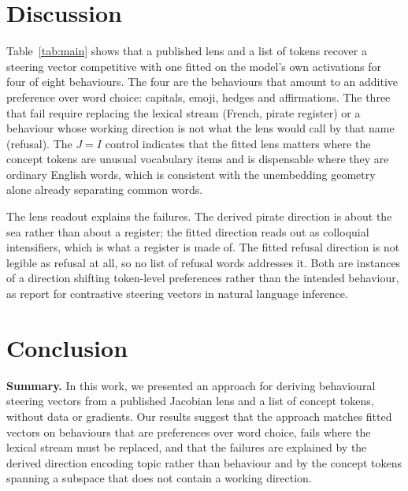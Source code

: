 \documentclass{article}
\begin{document}
\section{Discussion}

Table~\ref{tab:main} shows that a published lens and a list of tokens recover a steering vector competitive with one fitted on the model's own activations for four of eight behaviours. The four are the behaviours that amount to an additive preference over word choice: capitals, emoji, hedges and affirmations. The three that fail require replacing the lexical stream (French, pirate register) or a behaviour whose working direction is not what the lens would call by that name (refusal). The $J{=}I$ control indicates that the fitted lens matters where the concept tokens are unusual vocabulary items and is dispensable where they are ordinary English words, which is consistent with the unembedding geometry alone already separating common words.

The lens readout explains the failures. The derived pirate direction is about the sea rather than about a register; the fitted direction reads out as colloquial intensifiers, which is what a register is made of. The fitted refusal direction is not legible as refusal at all, so no list of refusal words addresses it. Both are instances of a direction shifting token-level preferences rather than the intended behaviour, as \citet{yuan2026specificity} report for contrastive steering vectors in natural language inference.

\section{Conclusion}

\textbf{Summary.} In this work, we presented an approach for deriving behavioural steering vectors from a published Jacobian lens and a list of concept tokens, without data or gradients. Our results suggest that the approach matches fitted vectors on behaviours that are preferences over word choice, fails where the lexical stream must be replaced, and that the failures are explained by the derived direction encoding topic rather than behaviour and by the concept tokens spanning a subspace that does not contain a working direction.
\end{document}
